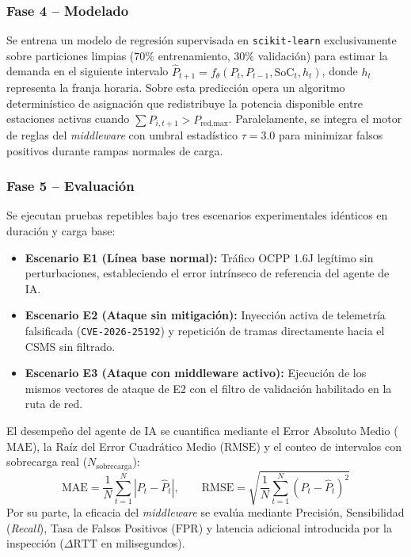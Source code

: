 \documentclass[conference]{IEEEtran}
\begin{document}
\subsubsection{Fase 4 -- Modelado}
Se entrena un modelo de regresión supervisada en \texttt{scikit-learn} exclusivamente sobre particiones limpias (70\% entrenamiento, 30\% validación) para estimar la demanda en el siguiente intervalo $\hat{P}_{t+1} = f_{\theta}(P_t, P_{t-1}, \text{SoC}_t, h_t)$, donde $h_t$ representa la franja horaria. Sobre esta predicción opera un algoritmo determinístico de asignación que redistribuye la potencia disponible entre estaciones activas cuando $\sum \hat{P}_{i,t+1} > P_{\text{red,max}}$. Paralelamente, se integra el motor de reglas del \textit{middleware} con umbral estadístico $\tau = 3.0$ para minimizar falsos positivos durante rampas normales de carga.

\subsubsection{Fase 5 -- Evaluación}
Se ejecutan pruebas repetibles bajo tres escenarios experimentales idénticos en duración y carga base:
\begin{itemize}
    \item \textbf{Escenario E1 (Línea base normal):} Tráfico OCPP 1.6J legítimo sin perturbaciones, estableciendo el error intrínseco de referencia del agente de IA.
    \item \textbf{Escenario E2 (Ataque sin mitigación):} Inyección activa de telemetría falsificada (\texttt{CVE-2026-25192}) y repetición de tramas directamente hacia el CSMS sin filtrado.
    \item \textbf{Escenario E3 (Ataque con middleware activo):} Ejecución de los mismos vectores de ataque de E2 con el filtro de validación habilitado en la ruta de red.
\end{itemize}

El desempeño del agente de IA se cuantifica mediante el Error Absoluto Medio ($\text{MAE}$), la Raíz del Error Cuadrático Medio ($\text{RMSE}$) y el conteo de intervalos con sobrecarga real ($N_{\text{sobrecarga}}$):
\begin{equation}
\text{MAE} = \frac{1}{N}\sum_{t=1}^{N} |P_t - \hat{P}_t|, \qquad \text{RMSE} = \sqrt{\frac{1}{N}\sum_{t=1}^{N} (P_t - \hat{P}_t)^2}
\end{equation}
Por su parte, la eficacia del \textit{middleware} se evalúa mediante Precisión, Sensibilidad (\textit{Recall}), Tasa de Falsos Positivos ($\text{FPR}$) y latencia adicional introducida por la inspección ($\Delta \text{RTT}$ en milisegundos).
\end{document}
